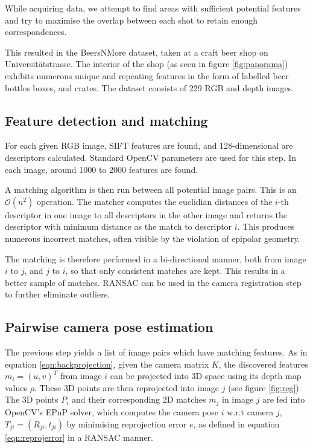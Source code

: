 \documentclass[10pt,twocolumn,letterpaper]{article}
\begin{document}
While acquiring data, we attempt to find areas with sufficient potential
features and try to maximise the overlap between each shot to retain enough
correspondences.

This resulted in the BeersNMore dataset, taken at a craft beer shop on
Universit\"atstrasse. The interior of the shop (as seen in figure \ref{fig:panorama}) exhibits
numerous unique and repeating features in the form of labelled beer bottles
boxes, and crates. The dataset consists of 229 RGB and depth images.




\subsection{Feature detection and matching}\label{sec:extractfeature}

For each given RGB image, SIFT features are found, and 128-dimensional are
descriptors calculated. Standard OpenCV parameters are used for this step.
In each image, around 1000 to 2000 features are found.

A matching algorithm is then run between all potential image pairs. This is
an $\mathcal{O}(n^2)$ operation. The matcher computes the euclidian distances of the $i$-th descriptor in one image to all descriptors in the other image and returns the descriptor with minimum distance as the match to descriptor $i$. This produces numerous
incorrect matches, often visible by the violation of epipolar geometry.

The matching is therefore performed in a bi-directional manner, both from image
$i$ to $j$, and $j$ to $i$, so that only consistent matches are kept. This results in a better sample of matches. RANSAC
can be used in the camera registration step to further eliminate outliers.




\subsection{Pairwise camera pose estimation}

The previous step yields a list of image pairs which have matching features.
As in equation \ref{eqn:backprojection}, given the camera matrix $K$, the discovered features $m_{i} = (u,v)^{T}$ from image $i$ can be projected into 3D space
using its depth map values $\rho$. These 3D points are then reprojected into image $j$ (see figure \ref{fig:reg}). The 3D points $P_{i}$ and their corresponding 2D matches $m_{j}$ in image $j$ are fed into OpenCV's EPnP solver, which computes the camera pose $i$ w.r.t camera $j$, $T_{ji} = \left(R_{ji}, t_{ji}\right)$ by minimising reprojection error $e$, as defined in equation \ref{eqn:reprojerror} in a RANSAC manner.
\end{document}
